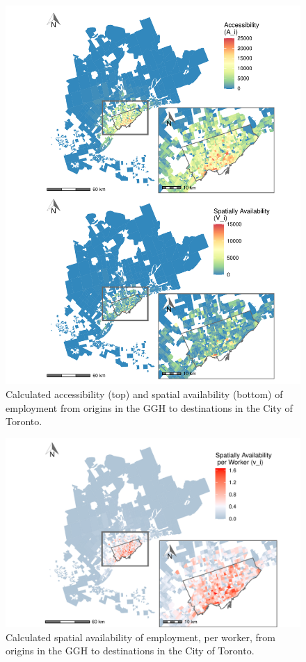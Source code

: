 \documentclass[]{elsarticle} %
\begin{document}
\begin{figure}
\includegraphics[width=1\linewidth]{Spatial-Availability_files/figure-latex/plot-access-SA-Toronto-TTS-1} \caption{\label{fig:plot-access-SA-Toronto-TTS}Calculated accessibility (top) and spatial availability (bottom) of employment from origins in the GGH to destinations in the City of Toronto.}\label{fig:plot-access-SA-Toronto-TTS}
\end{figure}

\begin{figure}
\includegraphics[width=1\linewidth]{Spatial-Availability_files/figure-latex/plot-avail-Toronto-TTS-per-worker-1} \caption{\label{fig:plot-avail-Toronto-TTS-per-worker}Calculated spatial availability of employment, per worker, from origins in the GGH to destinations in the City of Toronto.}\label{fig:plot-avail-Toronto-TTS-per-worker}
\end{figure}
\end{document}
